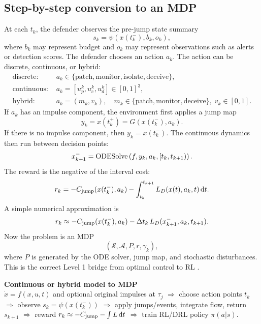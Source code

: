 \documentclass[11pt,a4paper]{article}
\begin{document}
\subsection{Step-by-step conversion to an MDP}
At each $t_k$, the defender observes the pre-jump state summary
\begin{equation}
s_k=\psi(x(t_k^-),b_k,o_k),
\end{equation}
where $b_k$ may represent budget and $o_k$ may represent observations such as alerts or detection scores. The defender chooses an action $a_k$. The action can be discrete, continuous, or hybrid:
\begin{align}
\text{discrete: }&a_k\in\{\text{patch},\text{monitor},\text{isolate},\text{deceive}\},\\
\text{continuous: }&a_k=[u_p^k,u_c^k,u_d^k]\in[0,1]^3,\\
\text{hybrid: }&a_k=(m_k,v_k),\quad m_k\in\{\text{patch},\text{monitor},\text{deceive}\},\; v_k\in[0,1].
\end{align}
If $a_k$ has an impulse component, the environment first applies a jump map
\begin{equation}
y_k=x(t_k^+)=G(x(t_k^-),a_k).
\end{equation}
If there is no impulse component, then $y_k=x(t_k^-)$. The continuous dynamics then run between decision points:
\begin{equation}
x_{k+1}^-=\operatorname{ODESolve}\left(f,y_k,a_k,[t_k,t_{k+1})\right).
\end{equation}
The reward is the negative of the interval cost:
\begin{equation}
r_k=-C_{\rm jump}(x(t_k^-),a_k)-\int_{t_k}^{t_{k+1}}L_D(x(t),a_k,t)\,\mathrm{d} t.
\end{equation}
A simple numerical approximation is
\begin{equation}
r_k\approx -C_{\rm jump}(x(t_k^-),a_k)-\Delta t_k\,L_D(x_{k+1}^-,a_k,t_{k+1}).
\end{equation}
Now the problem is an MDP
\begin{equation}
(\mathcal{S},\mathcal{A},P,r,\gamma_k),
\end{equation}
where $P$ is generated by the ODE solver, jump map, and stochastic disturbances. This is the correct Level 1 bridge from optimal control to RL \cite{sutton2018}.

\begin{flowbox}
\textbf{Continuous or hybrid model to MDP}\\[0.3em]
$\dot{x}=f(x,u,t)$ and optional original impulses at $\tau_j$\quad
$\Longrightarrow$ choose action points $t_k$\quad
$\Longrightarrow$ observe $s_k=\psi(x(t_k^-))$\quad
$\Longrightarrow$ apply jumps/events, integrate flow, return $s_{k+1}$\quad
$\Longrightarrow$ reward $r_k\approx-C_{\rm jump}-\int L\,\mathrm{d} t$\quad
$\Longrightarrow$ train RL/DRL policy $\pi(a|s)$.
\end{flowbox}
\end{document}
